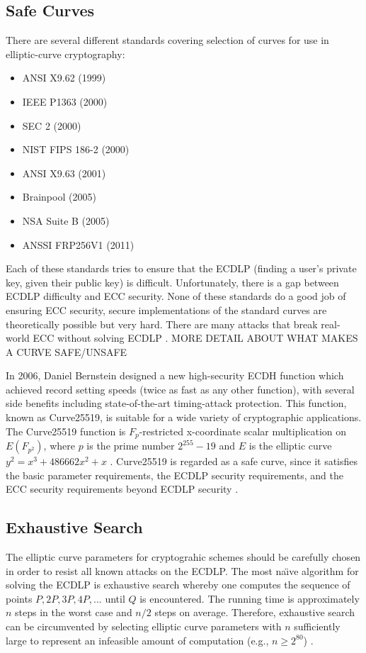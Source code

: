 \documentclass[12pt,a4paper]{article}
\begin{document}
\subsection{Safe Curves} \label{Safe Curves}
There are several different standards covering selection of curves for use in elliptic-curve cryptography: 
\begin{itemize}
    \item ANSI X9.62 (1999)
    \item IEEE P1363 (2000)
    \item SEC 2 (2000)
    \item NIST FIPS 186-2 (2000)
    \item ANSI X9.63 (2001)
    \item Brainpool (2005)
    \item NSA Suite B (2005)
    \item ANSSI FRP256V1 (2011)
\end{itemize}
Each of these standards tries to ensure that the ECDLP (finding a user's private key, given their public key) is difficult. 
Unfortunately, there is a gap between ECDLP difficulty and ECC security. 
None of these standards do a good job of ensuring ECC security, 
secure implementations of the standard curves are theoretically possible but very hard. 
There are many attacks that break real-world ECC without solving ECDLP \cite{bernstein2013safecurves}. 
MORE DETAIL ABOUT WHAT MAKES A CURVE SAFE/UNSAFE

In 2006, Daniel Bernstein designed a new high-security ECDH function which achieved record setting speeds (twice as fast as any other function), 
with several side benefits including state-of-the-art timing-attack protection. 
This function, known as Curve25519, is suitable for a wide variety of cryptographic applications. 
The Curve25519 function is $F_p$-restricted x-coordinate scalar multiplication on $E(F_{p^2})$, 
where $p$ is the prime number $2^{255} - 19$ and $E$ is the elliptic curve $y^2 = x^3 + 486662x^2 + x$ \cite{10.1007/11745853_14}.
Curve25519 is regarded as a safe curve, since it satisfies the basic parameter requirements, the ECDLP security requirements, 
and the ECC security requirements beyond ECDLP security \cite{bernstein2013safecurves}.

\subsection{Exhaustive Search} \label{Exhaustive Search}
The elliptic curve parameters for cryptograhic schemes should be carefully chosen in order to resist all known attacks on the ECDLP. 
The most na\"{\i}ve algorithm for solving the ECDLP is exhaustive search whereby one computes the sequence of points $P,2P,3P,4P,...$ until $Q$ is encountered. 
The running time is approximately $n$ steps in the worst case and $n/2$ steps on average. 
Therefore, exhaustive search can be circumvented by selecting elliptic curve parameters with $n$ sufficiently large to represent an infeasible amount of computation (e.g., $n \geq 2^{80}$) \cite{hankerson2003guide}.
\end{document}
